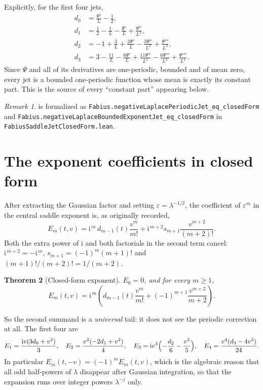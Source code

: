 \documentclass[11pt,oneside]{article}
\newtheorem{theorem}{Theorem}[section]
\theoremstyle{definition}
\theoremstyle{remark}
\newtheorem{remark}[theorem]{Remark}
\newcommand{\ii}{\mathrm i}
\begin{document}
Explicitly, for the first four jets,
\[
\begin{aligned}
  d_0&=\frac{\Psi'}{L}-\frac12,\\
  d_1&=\frac12-\frac1L-\frac{\Psi'}{L}+\frac{\Psi''}{L^2},\\
  d_2&=-1+\frac3L+\frac{2\Psi'}{L}-\frac{3\Psi''}{L^2}+\frac{\Psi'''}{L^3},\\
  d_3&=3-\frac{11}{L}-\frac{6\Psi'}{L}+\frac{11\Psi''}{L^2}
        -\frac{6\Psi'''}{L^3}+\frac{\Psi''''}{L^4}.
\end{aligned}
\]
Since $\Psi$ and all of its derivatives are one-periodic, bounded and of mean
zero, every jet is a bounded one-periodic function whose mean is exactly its
constant part.  This is the source of every ``constant part'' appearing below.

\begin{remark}
 is formalized as
\lstinline[style=pseudo]{Fabius.negativeLaplacePeriodicJet_eq_closedForm} and
\lstinline[style=pseudo]{Fabius.negativeLaplaceBoundedExponentJet_eq_closedForm}
in \nolinkurl{FabiusSaddleJetClosedForm.lean}.
\end{remark}

\section{The exponent coefficients in closed form}\label{sec:exponent}

After extracting the Gaussian factor and setting $\varepsilon=\lambda^{-1/2}$,
the coefficient of $\varepsilon^m$ in the central saddle exponent is, as
originally recorded,
\[
  E_m(t,v)=\ii^{\,m}\,d_{m-1}(t)\frac{v^m}{m!}
    +\ii^{\,m+2}s_{m+1}\frac{v^{m+2}}{(m+2)!}.
\]
Both the extra power of $\ii$ and both factorials in the second term cancel:
$\ii^{\,m+2}=-\ii^{\,m}$, $s_{m+1}=(-1)^m(m+1)!$ and
$(m+1)!/(m+2)!=1/(m+2)$.

\begin{theorem}[Closed-form exponent]\label{thm:exponent}
$E_0=0$, and for every $m\ge1$,
\[
  E_m(t,v)=\ii^{\,m}\left(d_{m-1}(t)\frac{v^m}{m!}
    +(-1)^{m+1}\frac{v^{m+2}}{m+2}\right).
\]
\end{theorem}

So the second summand is a \emph{universal} tail: it does not see the periodic
correction at all.  The first four are
\[
  E_1=\frac{\ii v(3d_0+v^2)}{3},\quad
  E_2=\frac{v^2(-2d_1+v^2)}{4},\quad
  E_3=\ii v^3\Bigl(-\frac{d_2}{6}-\frac{v^2}{5}\Bigr),\quad
  E_4=\frac{v^4(d_3-4v^2)}{24}.
\]
In particular $E_m(t,-v)=(-1)^mE_m(t,v)$, which is the algebraic reason that
all odd half-powers of $\lambda$ disappear after Gaussian integration, so that
the expansion runs over integer powers $\lambda^{-j}$ only.
\end{document}
